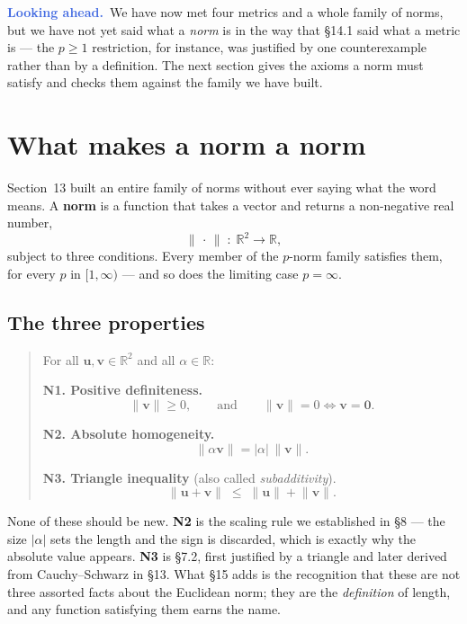 \documentclass[11pt]{article}
\theoremstyle{definition}
\theoremstyle{remark}
\newcommand{\lookahead}{\par\smallskip\noindent
  \textbf{\sffamily\textcolor{RoyalBlue}{Looking ahead.}}\ \ignorespaces}
\newcommand{\R}{\mathbb{R}}
\newcommand{\vc}[1]{\mathbf{#1}}
\newcommand{\norm}[1]{\lVert #1\rVert}
\begin{document}
\lookahead We have now met four metrics and a whole family of norms, but we have
not yet said what a \emph{norm} is in the way that \S14.1 said what a metric is
--- the $p\ge1$ restriction, for instance, was justified by one counterexample
rather than by a definition. The next section gives the axioms a norm must
satisfy and checks them against the family we have built.

\section{What makes a norm a norm}
Section~13 built an entire family of norms without ever saying what the word
means. A \textbf{norm} is a function that takes a vector and returns a
non-negative real number,
\[
  \norm{\,\cdot\,}\;:\;\R^{2}\to\R ,
\]
subject to three conditions. Every member of the $p$-norm family satisfies them,
for every $p$ in $[1,\infty)$ --- and so does the limiting case $p=\infty$.

\subsection{The three properties}
\begin{quote}
For all $\vc{u},\vc{v}\in\R^{2}$ and all $\alpha\in\R$:

\smallskip
\textbf{N1. Positive definiteness.}
\[
  \norm{\vc{v}}\ge 0,
  \qquad\text{and}\qquad
  \norm{\vc{v}}=0 \iff \vc{v}=\vc{0}.
\]

\smallskip
\textbf{N2. Absolute homogeneity.}
\[
  \norm{\alpha\vc{v}} = \lvert\alpha\rvert\,\norm{\vc{v}} .
\]

\smallskip
\textbf{N3. Triangle inequality} (also called \emph{subadditivity}).
\[
  \norm{\vc{u}+\vc{v}} \;\le\; \norm{\vc{u}}+\norm{\vc{v}} .
\]
\end{quote}

\noindent None of these should be new. \textbf{N2} is the scaling rule we
established in \S8 --- the size $\lvert\alpha\rvert$ sets the length and the sign
is discarded, which is exactly why the absolute value appears. \textbf{N3} is
\S7.2, first justified by a triangle and later derived from Cauchy--Schwarz in
\S13. What \S15 adds is the recognition that these are not three assorted
facts about the Euclidean norm; they are the \emph{definition} of length, and any
function satisfying them earns the name.
\end{document}
